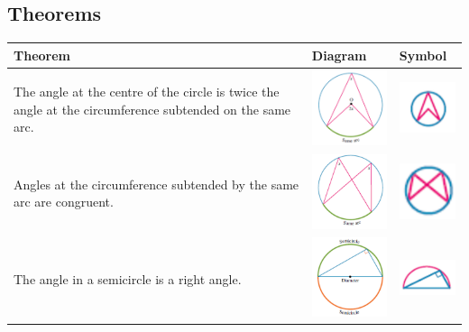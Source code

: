 \documentclass[a4paper,10pt]{report}
\begin{document}
\subsection{Theorems}
\begin{center}
	\begin{tabular}[center]{|p{5cm}|p{3cm}|p{2cm}|}
		\hline
		Theorem                                                                                                              & Diagram                                       & Symbol                                               \\ \hline
		The angle at the centre of the circle is twice the angle at the circumference subtended on the same arc.             & \includegraphics[width=3cm]{circle theorem 1} & \includegraphics[width=2cm]{circle theorem 1 symbol} \\ \hline
		Angles at the circumference subtended by the same arc are congruent.                                                 & \includegraphics[width=3cm]{circle theorem 2} & \includegraphics[width=2cm]{circle theorem 2 symbol} \\ \hline
		The angle in a semicircle is a right angle.                                                                          & \includegraphics[width=3cm]{circle theorem 3} & \includegraphics[width=2cm]{circle theorem 3 symbol} \\ \hline

\end{tabular}
\end{center}
\end{document}
